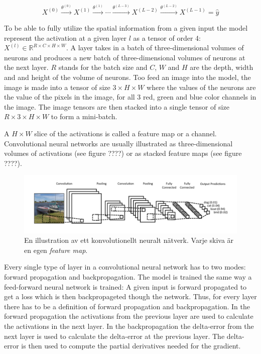 \documentclass[a4paper,11pt,twoside]{article}
\begin{document}
\begin{equation}\label{CNNeq}
X^{(0)} \xrightarrow{\theta^{(0)}} X^{(1)}  \xrightarrow{\theta^{(1)}} \cdots  \xrightarrow{\theta^{(L-3)}} X^{(L-2)}  \xrightarrow{\theta^{(L-2)}} X^{(L-1)} = \hat{y}
\end{equation}

To be able to fully utilize the spatial information from a given input the model represent the activation at a given layer $l$ as a tensor of order 4: $X^{(l)} \in \mathbb{R}^{R \times C  \times H \times W}$. A layer takes in a batch of three-dimensional volumes of neurons and produces a new batch of three-dimensional volumes of neurons at the next layer. $R$ stands for the batch size and $C$, $W$ and $H$ are the depth, width and and height of the volume of neurons. Too feed an image into the model, the image is made into a tensor of size $3 \times H \times W$ where the values of the neurons are the value of the pixels in the image, for all 3 red, green and blue color channels in the image. The image tensors are then stacked into a single tensor of size $R \times 3 \times H \times W$ to form a mini-batch.

A $H \times W$ slice of the activations is called a feature map or a channel. Convolutional neural networks are usually illustrated as three-dimensional volumes of activations (see figure ????) or as stacked feature maps (see figure ????). 

\begin{figure}[h]\label{figboatcnn}
	\centering
  		\includegraphics[scale=0.6]{boatcnn.png}
  	\caption{En illustration av ett konvolutionellt neuralt nätverk. Varje skiva är en egen \textit{feature map}. \cite{figboatcnn}}
\end{figure}

Every single type of layer in a convolutional neural network has to two modes: forward propagation and backpropagation. The model is trained the same way a feed-forward neural network is trained: A given input is forward propagated to get a loss which is then backpropageted though the network. Thus, for every layer there has to be a definition of forward propagation and backpropagation. In the forward propagation the activations from the previous layer are used to calculate the activations in the next layer. In the backpropagation the delta-error from the next layer is used to calculate the delta-error at the previous layer. The delta-error is then used to compute the partial derivatives needed for the gradient.
\end{document}
